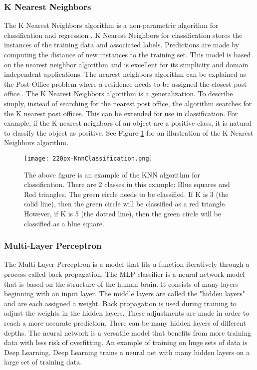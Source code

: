 \subsubsection{K Nearest Neighbors}
The K Nearest Neighbors algorithm is a non-parametric algorithm for classification and regression \cite{altman1992introduction}.
K Nearest Neighbors for classification stores the instances of the training data and associated labels.
Predictions are made by computing the distance of new instances to the training set.
This model is based on the nearest neighbor algorithm and is excellent for its simplicity and domain independent applications.
The nearest neighbors algorithm can be explained as the Post Office problem where a residence needs to be assigned the closest post office \cite{knuth1997art}.
The K Nearest Neighbors algorithm is a generalization.
To describe simply, instead of searching for the nearest post office, the algorithm searches for the K nearest post offices.
This can be extended for use in classification.
For example, if the K nearest neighbors of an object are a positive class, it is natural to classify the object as positive.
See Figure \ref{fig:knn} for an illustration of the K Nearest Neighbors algorithm.

\begin{figure}[htp]
    \centering
    \texttt{[image: 220px-KnnClassification.png]}
    \caption{The above figure is an example of the KNN algorithm for classification. There are 2 classes in this example: Blue squares and Red triangles.
    The green circle needs to be classified. If K is 3 (the solid line), then the green circle will be classified as a red triangle. 
    However, if K is 5 (the dotted line), then the green circle will be classified as a blue square.}
    \label{fig:knn}
\end{figure}


\subsubsection{Multi-Layer Perceptron}
The Multi-Layer Perceptron is a model that fits a function iteratively through a process called back-propagation.
The MLP classifier is a neural network model that is based on the structure of the human brain.
It consists of many layers beginning with an input layer.
The middle layers are called the "hidden layers" and are each assigned a weight.
Back propagation is used during training to adjust the weights in the hidden layers.
These adjustments are made in order to reach a more accurate prediction.
There can be many hidden layers of different depths.
The neural network is a versatile model that benefits from more training data with less risk of overfitting.
An example of training on huge sets of data is Deep Learning.
Deep Learning trains a neural net with many hidden layers on a large set of training data.

